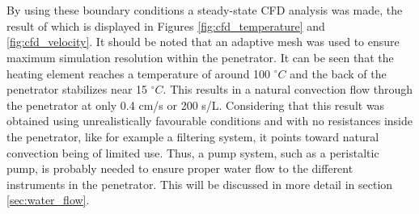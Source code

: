 \\
\\
By using these boundary conditions a steady-state CFD analysis was made, the result of which is displayed in Figures \ref{fig:cfd_temperature} and \ref{fig:cfd_velocity}. It should be noted that an adaptive mesh was used to ensure maximum simulation resolution within the penetrator.
It can be seen that the heating element reaches a temperature of around 100 $^\circ C$ and the back of the penetrator stabilizes near 15 $^\circ C$. This results in a natural convection flow through the penetrator at only 0.4 cm/s or 200 s/L. Considering that this result was obtained using unrealistically favourable conditions and with no resistances inside the penetrator, like for example a filtering system, it points toward natural convection being of limited use. Thus, a pump system, such as a peristaltic pump, is probably needed to ensure proper water flow to the different instruments in the penetrator. This will be discussed in more detail in section \ref{sec:water_flow}.



